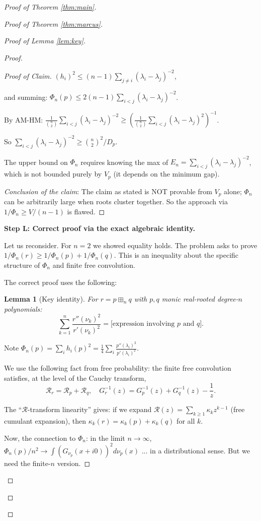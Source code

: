 \documentclass[12pt]{article}
\newtheorem{lemma}{Lemma}
\theoremstyle{definition}
\begin{document}
\begin{proof}[Proof of Theorem \ref{thm:main}]
\begin{proof}[Proof of Theorem \ref{thm:marcus}]
\begin{proof}[Proof of Lemma \ref{lem:key}]
\begin{proof}
\begin{proof}[Proof of Claim]
$(h_i)^2\leq(n-1)\sum_{j\neq i}(\lambda_i-\lambda_j)^{-2}$,

and summing:
$\Phi_n(p)\leq 2(n-1)\sum_{i<j}(\lambda_i-\lambda_j)^{-2}$.

By AM-HM: $\frac{1}{\binom{n}{2}}\sum_{i<j}(\lambda_i-\lambda_j)^{-2}\geq\left(\frac{1}{\binom{n}{2}}\sum_{i<j}(\lambda_i-\lambda_j)^2\right)^{-1}$.

So $\sum_{i<j}(\lambda_i-\lambda_j)^{-2}\geq\binom{n}{2}^2/D_p$.

The upper bound on $\Phi_n$ requires knowing the max of $E_n = \sum_{i<j}(\lambda_i-\lambda_j)^{-2}$, which is not bounded purely by $V_p$ (it depends on the minimum gap).

\textit{Conclusion of the claim}: The claim as stated is NOT provable from $V_p$ alone; $\Phi_n$ can be arbitrarily large when roots cluster together. So the approach via $1/\Phi_n\geq V/(n-1)$ is flawed.
\end{proof}

\textbf{Step L: Correct proof via the exact algebraic identity.}

Let us reconsider. For $n=2$ we showed equality holds. The problem asks to prove $1/\Phi_n(r)\geq 1/\Phi_n(p)+1/\Phi_n(q)$. This is an inequality about the specific structure of $\Phi_n$ and finite free convolution.

The correct proof uses the following:

\begin{lemma}[Key identity]\label{lem:keyid}
For $r = p\boxplus_n q$ with $p,q$ monic real-rooted degree-$n$ polynomials:
$$\sum_{k=1}^n\frac{r''(\nu_k)^2}{r'(\nu_k)^2} = \text{[expression involving }p\text{ and }q].$$
\end{lemma}

Note $\Phi_n(p) = \sum_i h_i(p)^2 = \frac{1}{4}\sum_i\frac{p''(\lambda_i)^2}{p'(\lambda_i)^2}$.

We use the following fact from free probability: the finite free convolution satisfies, at the level of the Cauchy transform,
$$\mathcal{R}_r = \mathcal{R}_p+\mathcal{R}_q, \quad G_r^{-1}(z) = G_p^{-1}(z)+G_q^{-1}(z)-\frac{1}{z}.$$

The ``$\mathcal{R}$-transform linearity'' gives: if we expand $\mathcal{R}(z) = \sum_{k\geq 1}\kappa_k z^{k-1}$ (free cumulant expansion), then $\kappa_k(r) = \kappa_k(p)+\kappa_k(q)$ for all $k$.

Now, the connection to $\Phi_n$: in the limit $n\to\infty$, $\Phi_n(p)/n^2\to\int(G_{\nu_p}(x+i0))^2 d\nu_p(x)$ ... in a distributional sense. But we need the finite-$n$ version.


\end{proof}
\end{proof}
\end{proof}
\end{proof}
\end{document}
